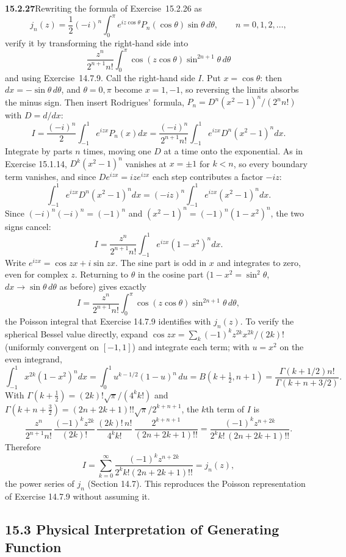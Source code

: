 \par\bigskip
\noindent\textbf{15.2.27}\quad Rewriting the formula of
Exercise~15.2.26 as
\[
j_{n}(z)=\frac{1}{2}(-i)^{n}\int_{0}^{\pi}e^{iz\cos\theta}
P_{n}(\cos\theta)\sin\theta\,d\theta,\qquad n=0,1,2,\ldots,
\]
verify it by transforming the right-hand side into
\[
\frac{z^{n}}{2^{n+1}n!}\int_{0}^{\pi}\cos(z\cos\theta)
\sin^{2n+1}\theta\,d\theta
\]
and using Exercise~14.7.9.
\solution
Call the right-hand side $I$. Put $x=\cos\theta$: then
$dx=-\sin\theta\,d\theta$, and $\theta=0,\pi$ become $x=1,-1$, so
reversing the limits absorbs the minus sign. Then insert Rodrigues'
formula, $P_n=D^n(x^2-1)^n/(2^nn!)$ with $D=d/dx$:
\[
I=\frac{(-i)^n}{2}\int_{-1}^1e^{izx}P_n(x)dx
=\frac{(-i)^n}{2^{n+1}n!}
 \int_{-1}^1e^{izx}D^n(x^2-1)^n dx.
\]
Integrate by parts $n$ times, moving one $D$ at a time onto the
exponential. As in Exercise 15.1.14, $D^k(x^2-1)^n$ vanishes at
$x=\pm1$ for $k<n$, so every boundary term vanishes, and since
$De^{izx}=ize^{izx}$ each step contributes a factor $-iz$:
\[
\int_{-1}^1e^{izx}D^n(x^2-1)^ndx
=(-iz)^n\int_{-1}^1e^{izx}(x^2-1)^ndx.
\]
Since $(-i)^n(-i)^n=(-1)^n$ and $(x^2-1)^n=(-1)^n(1-x^2)^n$, the two
signs cancel:
\[
I=\frac{z^n}{2^{n+1}n!}\int_{-1}^1e^{izx}(1-x^2)^n dx.
\]
Write $e^{izx}=\cos zx+i\sin zx$. The sine part is odd in $x$ and
integrates to zero, even for complex $z$. Returning to $\theta$ in the
cosine part ($1-x^2=\sin^2\theta$, $dx\to\sin\theta\,d\theta$ as
before) gives exactly
\[
I=\frac{z^n}{2^{n+1}n!}\int_0^\pi
\cos(z\cos\theta)\sin^{2n+1}\theta\,d\theta,
\]
the Poisson integral that Exercise 14.7.9 identifies with $j_n(z)$.
To verify the spherical Bessel value directly, expand
$\cos zx=\sum_k(-1)^kz^{2k}x^{2k}/(2k)!$ (uniformly convergent on
$[-1,1]$) and integrate each term; with $u=x^2$ on the even integrand,
\[
\int_{-1}^1x^{2k}(1-x^2)^ndx
=\int_0^1u^{k-1/2}(1-u)^n\,du
=B(k+\tfrac12,n+1)
=\frac{\Gamma(k+1/2)n!}{\Gamma(k+n+3/2)}.
\]
With $\Gamma(k+\frac12)=(2k)!\sqrt\pi/(4^kk!)$ and
$\Gamma(k+n+\frac32)=(2n+2k+1)!!\sqrt\pi/2^{k+n+1}$, the $k$th term of
$I$ is
\[
\frac{z^n}{2^{n+1}n!}\,\frac{(-1)^kz^{2k}}{(2k)!}\,
\frac{(2k)!\,n!}{4^kk!}\,\frac{2^{k+n+1}}{(2n+2k+1)!!}
=\frac{(-1)^kz^{n+2k}}{2^kk!\,(2n+2k+1)!!}.
\]
Therefore
\[
I=\sum_{k=0}^\infty
\frac{(-1)^kz^{n+2k}}{2^kk!(2n+2k+1)!!}=j_n(z),
\]
the power series of $j_n$ (Section 14.7). This reproduces the
Poisson representation of Exercise 14.7.9 without assuming it.

\subsection*{15.3 Physical Interpretation of Generating Function}

